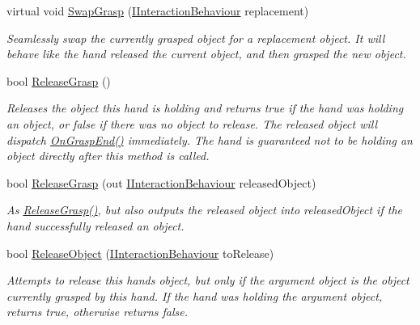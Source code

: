 \begin{DoxyCompactItemize}
virtual void \mbox{\hyperlink{class_leap_1_1_unity_1_1_interaction_1_1_interaction_controller_a329e2f56f76c46d70a93b4508e867196}{Swap\+Grasp}} (\mbox{\hyperlink{interface_leap_1_1_unity_1_1_interaction_1_1_i_interaction_behaviour}{I\+Interaction\+Behaviour}} replacement)
\begin{DoxyCompactList}\small\item\em Seamlessly swap the currently grasped object for a replacement object. It will behave like the hand released the current object, and then grasped the new object. \end{DoxyCompactList}\item 
bool \mbox{\hyperlink{class_leap_1_1_unity_1_1_interaction_1_1_interaction_controller_a3468a89e21c685d6df962ce70684c92f}{Release\+Grasp}} ()
\begin{DoxyCompactList}\small\item\em Releases the object this hand is holding and returns true if the hand was holding an object, or false if there was no object to release. The released object will dispatch \mbox{\hyperlink{class_leap_1_1_unity_1_1_interaction_1_1_interaction_controller_a1ff810c665a33a222e7d736ac224d839}{On\+Grasp\+End()}} immediately. The hand is guaranteed not to be holding an object directly after this method is called. \end{DoxyCompactList}\item 
bool \mbox{\hyperlink{class_leap_1_1_unity_1_1_interaction_1_1_interaction_controller_a4f865088ea9a5504f0e965764e7514a8}{Release\+Grasp}} (out \mbox{\hyperlink{interface_leap_1_1_unity_1_1_interaction_1_1_i_interaction_behaviour}{I\+Interaction\+Behaviour}} released\+Object)
\begin{DoxyCompactList}\small\item\em As \mbox{\hyperlink{class_leap_1_1_unity_1_1_interaction_1_1_interaction_controller_a3468a89e21c685d6df962ce70684c92f}{Release\+Grasp()}}, but also outputs the released object into released\+Object if the hand successfully released an object. \end{DoxyCompactList}\item 
bool \mbox{\hyperlink{class_leap_1_1_unity_1_1_interaction_1_1_interaction_controller_afcd8f7927d59f8dfd8a022c2d4dea11a}{Release\+Object}} (\mbox{\hyperlink{interface_leap_1_1_unity_1_1_interaction_1_1_i_interaction_behaviour}{I\+Interaction\+Behaviour}} to\+Release)
\begin{DoxyCompactList}\small\item\em Attempts to release this hand\textquotesingle{}s object, but only if the argument object is the object currently grasped by this hand. If the hand was holding the argument object, returns true, otherwise returns false. \end{DoxyCompactList}\item 

\end{DoxyCompactItemize}
